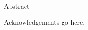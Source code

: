 \begin{abstractlong}
    Abstract
\end{abstractlong}

\begin{acknowledgementslong}
    Acknowledgements go here.
\end{acknowledgementslong}
